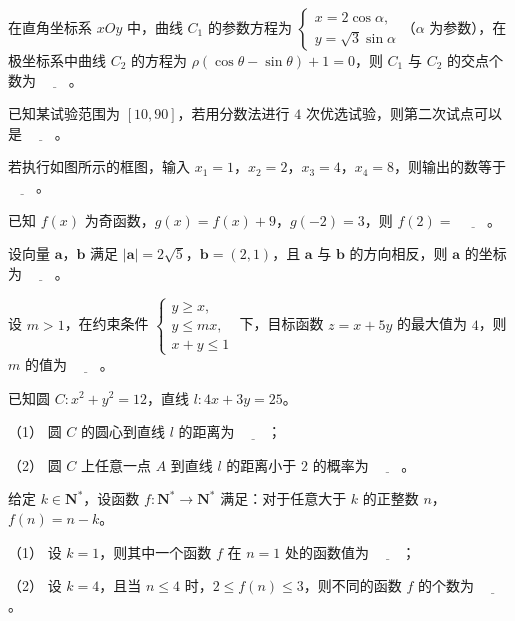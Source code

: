 \begin{question}
在直角坐标系 $xOy$ 中，曲线 $C_1$ 的参数方程为 $\begin{cases}x=2\cos\alpha,\\y=\sqrt3\sin\alpha\end{cases}$（$\alpha$ 为参数），在极坐标系中曲线 $C_2$ 的方程为 $\rho(\cos\theta-\sin\theta)+1=0$，则 $C_1$ 与 $C_2$ 的交点个数为 $\underline{\qquad}$。

\end{question}
\begin{question}
已知某试验范围为 $[10,90]$，若用分数法进行 $4$ 次优选试验，则第二次试点可以是 $\underline{\qquad}$。

\Needspace{0.4\textheight}
\end{question}
\begin{question}
若执行如图所示的框图，输入 $x_1=1$，$x_2=2$，$x_3=4$，$x_4=8$，则输出的数等于 $\underline{\qquad}$。
\nopagebreak[4]
\begin{center}\end{center}
\nopagebreak[4]
\end{question}
\begin{question}
已知 $f(x)$ 为奇函数，$g(x)=f(x)+9$，$g(-2)=3$，则 $f(2)=$ $\underline{\qquad}$。

\end{question}
\begin{question}
设向量 $\boldsymbol a$，$\boldsymbol b$ 满足 $|\boldsymbol a|=2\sqrt5$，$\boldsymbol b=(2,1)$，且 $\boldsymbol a$ 与 $\boldsymbol b$ 的方向相反，则 $\boldsymbol a$ 的坐标为 $\underline{\qquad}$。

\end{question}
\begin{question}
设 $m>1$，在约束条件 $\begin{cases}y\geqslant x,\\y\leqslant mx,\\x+y\leqslant1\end{cases}$ 下，目标函数 $z=x+5y$ 的最大值为 $4$，则 $m$ 的值为 $\underline{\qquad}$。

\end{question}
\begin{question}
已知圆 $C:x^2+y^2=12$，直线 $l:4x+3y=25$。

（1） 圆 $C$ 的圆心到直线 $l$ 的距离为 $\underline{\qquad}$；

（2） 圆 $C$ 上任意一点 $A$ 到直线 $l$ 的距离小于 $2$ 的概率为 $\underline{\qquad}$。

\end{question}
\begin{question}
给定 $k\in\mathbf N^*$，设函数 $f:\mathbf N^*\to\mathbf N^*$ 满足：对于任意大于 $k$ 的正整数 $n$，$f(n)=n-k$。

（1） 设 $k=1$，则其中一个函数 $f$ 在 $n=1$ 处的函数值为 $\underline{\qquad}$；

（2） 设 $k=4$，且当 $n\leqslant4$ 时，$2\leqslant f(n)\leqslant3$，则不同的函数 $f$ 的个数为 $\underline{\qquad}$。

\end{question}

